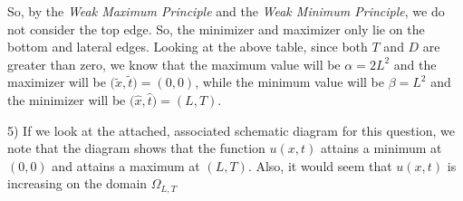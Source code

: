 \documentclass[executivepaper]{article}
\begin{document}
\begin{flushleft}
\begin{center}
\vspace{5mm}

So, by the \textit{Weak Maximum Principle} and the \textit{Weak Minimum Principle}, we do not consider the top edge. So, the minimizer and maximizer only lie on the bottom and lateral edges.
Looking at the above table, since both $T$ and $D$ are greater than zero, we know that the maximum value will be $\alpha=2L^2$ and the maximizer will be $\Big(\tilde{x}, \tilde{t}\Big)=(0,0)$, while the minimum value will be $\beta=L^2$ and the minimizer will be $\Big(\hat{x}, \hat{t}\Big)=(L,T)$.

\end{center}

\end{flushleft}

\begin{flushleft}

5) If we look at the attached, associated schematic diagram for this question, we note that the diagram shows that the function $u(x,t)$ attains a minimum at $(0,0)$ and attains a maximum at $(L,T)$. Also, it would seem that $u(x,t)$ is increasing on the domain $\Omega_{L,T}$

\end{flushleft}
\end{document}
